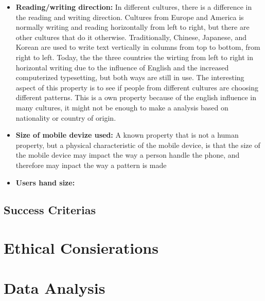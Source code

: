 \begin{itemize}
        \item {\bf Reading/writing direction:} In different cultures, there is a difference in the reading and writing direction. Cultures from Europe and America is normally writing and reading horizontally from left to right, but there are other cultures that do it otherwise. Traditionally, Chinese, Japanese, and Korean are used to write text vertically in columns from top to bottom, from right to left. Today, the the three countries the wirting from left to right in horizontal writing due to the influence of English and the increased computerized typesetting, but both ways are still in use. The interesting aspect of this property is to see if people from different cultures are choosing different patterns. This is a own property because of the english influence in many cultures, it might not be enough to make a analysis based on nationality or country of origin. 
        \item {\bf Size of mobile devize used:} A known property that is not a human property, but a physical characteristic of the mobile device, is that the size of the mobile device may impact the way a person handle the phone, and therefore may inpact the way a pattern is made
        \item {\bf Users hand size:}
      \end{itemize}


    \subsection{Success Criterias}


    \section{Ethical Consierations}

  \section{Data Analysis}






